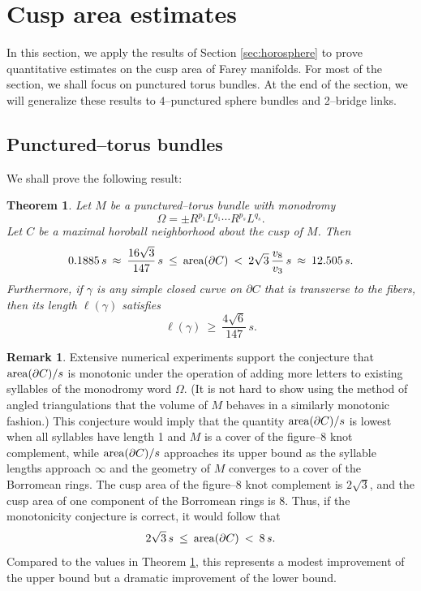 \documentclass[11pt]{amsart}
\newcommand{\area}{{\rm area}}
\newcommand{\bdy}{{\partial}}
\theoremstyle{plain}
\newtheorem{theorem}{Theorem}[section]
\theoremstyle{definition}
\newtheorem*{remark}{Remark}
\begin{document}
\section{Cusp area estimates}\label{sec:cusp-area}

In this section, we apply the results of Section \ref{sec:horosphere}
to prove quantitative estimates on the cusp area of Farey
manifolds. For most of the section, we shall focus on punctured torus
bundles.  At the end of the section, we will generalize these results
to $4$--punctured sphere bundles and 2--bridge links.


\subsection{Punctured--torus bundles}

We shall prove the following result:

\begin{theorem}\label{thm:ptorus-area}
Let $M$ be a punctured--torus bundle with monodromy
$$\Omega = \pm R^{p_1}L^{q_1} \cdots R^{p_s}L^{q_s}.$$
%
Let $C$ be a maximal horoball neighborhood about the cusp of $M$.
Then
$$0.1885 \, s \: \approx \: \frac{16 \sqrt{3}}{147}  \, s \: \leq \:  \area(\bdy C) \:<\: 2
\sqrt{3} \, \frac{v_8}{v_3} \, s \: \approx \: 12.505 \, s.$$
%
Furthermore, if $\gamma$ is any simple closed curve on $\bdy C$ that
is transverse to the fibers, then its length $\ell(\gamma)$ satisfies
$$ \ell(\gamma) \: \geq \: \frac{4\sqrt{6}}{147} \,  s.$$
\end{theorem}

\begin{remark} 
Extensive numerical experiments support the conjecture that
$\area(\bdy C)/s$ is monotonic under the operation of adding more
letters to existing syllables of the monodromy word $\Omega$.  (It is
not hard to show using the method of angled triangulations
\cite{gf:two-bridge} that the volume of $M$ behaves in a similarly
monotonic fashion.)  This conjecture would imply that the quantity
$\area(\bdy C)/s$ is lowest when all syllables have length 1 and $M$
is a cover of the figure--8 knot complement, while $\area(\bdy C)/s$
approaches its upper bound as the syllable lengths approach $\infty$
and the geometry of $M$ converges to a cover of the Borromean rings.
The cusp area of the figure--8 knot complement is $2\sqrt{3}$,
and the cusp area of one component of the Borromean rings is $8$. Thus, if the monotonicity
conjecture is correct, it would follow that
$$2\sqrt{3} \, s \: \leq \: \area(\bdy C) \:<\: 8 \, s.$$
Compared to the values in Theorem \ref{thm:ptorus-area}, this represents a modest improvement of the upper bound but a dramatic improvement of the lower bound.
\end{remark}
\end{document}
